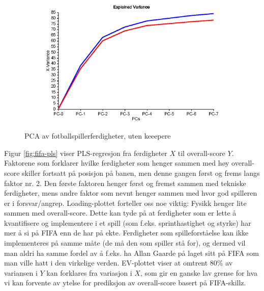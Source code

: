 \begin{figure}[h]
\begin{subfigure}[t]{0.48\textwidth}
 		\caption{}
 		\label{}
 	\end{subfigure}
 	\begin{subfigure}[t]{0.48\textwidth}
 		\centering
 		\includegraphics[width=\textwidth]{figurer/fifa-pca2-ev}
 		\caption{}
 		\label{}
 	\end{subfigure}
	\label{fig:fifa-pca2}
	\caption{PCA av fotballspillerferdigheter, uten keeepere}
 \end{figure}

 Figur \ref{fig:fifa-pls} viser PLS-regresjon fra ferdigheter $X$ til overall-score $Y$. Faktorene som forklarer hvilke ferdigheter som henger sammen med høy overall-score skiller fortsatt på posisjon på banen, men denne gangen først og frems langs faktor nr. 2. Den første faktoren henger først og fremst sammen med tekniske ferdigheter, mens andre faktor som nevnt henger sammen med hvor god spilleren er i forsvar/angrep. Loading-plottet forteller oss noe viktig: Fysikk henger lite sammen med overall-score. Dette kan tyde på at ferdigheter som er lette å kvantifisere og implementere i et spill (som f.eks. sprinthastighet og styrke) har mer å si på FIFA enn de har på ekte. Ferdigheter som spilleforståelse kan ikke implementeres på samme måte (de må den som spiller stå for), og dermed vil man aldri ha samme fordel av å f.eks. ha Allan Gaarde på laget sitt på FIFA som man ville hatt i den virkelige verden. EV-plottet viser at omtrent 80\% av variansen i $Y$ kan forklares fra variasjon i $X$, som gir en ganske lav grense for hva vi kan forvente av ytelse for prediksjon av overall-score basert på FIFA-skillz.


